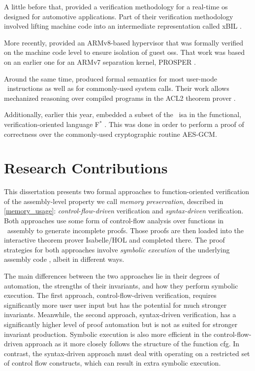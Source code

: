 A little before that, \textcite{shi2012orientais} provided a verification methodology
for a real-time \ac{os} designed for automotive applications.
Part of their verification methodology involved lifting machine code into an intermediate
representation called xBIL \autocite{shi2012xbil}.

More recently, \textcite{baumann2016high} provided an ARMv8-based hypervisor
that was formally verified on the machine code level
to ensure isolation of guest \acp{os}.
That work was based on an earlier one for an ARMv7 separation kernel,
PROSPER \autocite{dam2013hypervisor,dam2013formal}.

Around the same time, \textcite{goel2014syscalls,goelphd} produced formal semantics
for most user-mode \arch\ instructions as well as for commonly-used system calls.
Their work allows mechanized reasoning over compiled programs
in the ACL2 theorem prover \autocite{ACL2}.

Additionally, earlier this year, \textcite{fromherz2019verified} embedded a subset
of the \arch\ \ac{isa} in the functional, verification-oriented language
F$^*$ \autocite{fstar}.
This was done in order to perform a proof of correctness
over the commonly-used cryptographic routine AES-GCM.

\section{Research Contributions}
This dissertation presents two formal approaches to function-oriented verification
of the assembly-level property we call \emph{memory preservation},
described in \cref{memory_usage}:
\emph{control-flow-driven} verification and \emph{syntax-driven} verification.
Both approaches use some form of control-flow analysis over functions in \arch\ assembly
to generate incomplete proofs.
Those proofs are then loaded into the interactive theorem prover Isabelle/HOL
and completed there. The proof strategies for both approaches involve
\emph{symbolic execution} of the underlying assembly code \autocite{king1976symbolic},
albeit in different ways.

The main differences between the two approaches
lie in their degrees of automation, the strengths of their invariants,
and how they perform symbolic execution.
The first approach, control-flow-driven verification,
requires significantly more user user input but has the potential for much stronger invariants.
Meanwhile, the second approach, syntax-driven verification,
has a significantly higher level of proof automation
but is not as suited for stronger invariant production.
Symbolic execution is also more efficient in the control-flow-driven approach
as it more closely follows the structure of the function \ac{cfg}.
In contrast, the syntax-driven approach must deal with
operating on a restricted set of control flow constructs,
which can result in extra symbolic execution.


